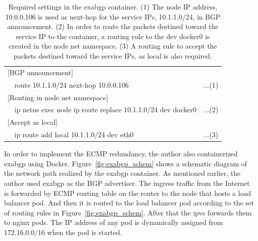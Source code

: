 \begin{table}
  \centering
  \begin{tabular}{lllr}
    \hline 
      \multicolumn{4}{l}{[BGP announcement]} \\
      \hspace{15 mm} & \multicolumn{2}{l}{route 10.1.1.0/24 next-hop 10.0.0.106} & ...(1) \\
      \multicolumn{4}{l}{[Routing in node net namespace]} \\
      \hspace{15 mm} & \multicolumn{2}{l}{ip netns exec node ip route replace 10.1.1.0/24 dev docker0} & ...(2) \\
      \multicolumn{4}{l}{[Accept as local]} \\
      \hspace{15 mm} & \multicolumn{2}{l}{ip route add local 10.1.1.0/24 dev eth0} & ...(3) \\
      \hline
  \end{tabular}
  
  \par\bigskip
  \centering
  \begin{minipage}{0.9\columnwidth}
    \caption[Required settings in the exabgp container]{
      Required settings in the exabgp container.
      (1) The node IP address, 10.0.0.106 is used as next-hop for the service IPs, 10.1.1.0/24, in BGP announcement.
      (2) In order to route the packets destined toward the service IP to the container, a routing rule to the dev docker0 is created in the node net namespace. 
      (3) A routing rule to accept the packets destined toward the service IPs,  as local is also required.
    }
    \label{table:exabgp_setting}
  \end{minipage}

\end{table}

In order to implement the ECMP redundancy, the author also containerized exabgp using Docker.
Figure~\ref{fig:exabgp_schem} shows a schematic diagram of the network path realized by the exabgp container.
As mentioned earlier, the author used exabgp as the BGP advertiser. 
The ingress traffic from the Internet is forwarded by ECMP routing table on the router to the node that hosts a load balancer pod.
And then it is routed to the load balancer pod according to the set of routing rules in Figure~\ref{fig:exabgp_schem}.
After that the ipvs forwards them to nginx pods.
The IP address of any pod is dynamically assigned from 172.16.0.0/16 when the pod is started. 

